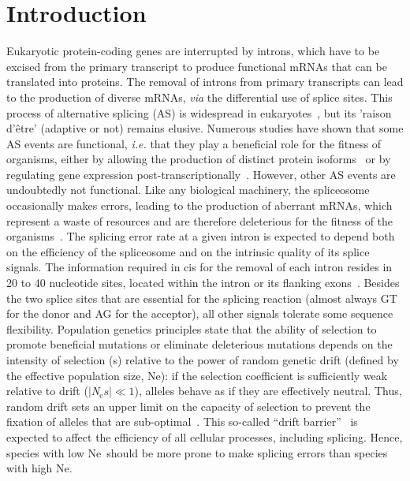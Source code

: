     {\hypersetup{linkcolor=GREYDARK}\minitoc\newpage}
    
\graphicspath{{chap6-Alternative Splicing/figures/}}

\section{Introduction}
Eukaryotic protein-coding genes are interrupted by introns, which have to be excised from the primary transcript to produce functional mRNAs that can be translated into proteins. The removal of introns from primary transcripts can lead to the production of diverse mRNAs, \textit{via} the differential use of splice sites. This process of alternative splicing (AS) is widespread in eukaryotes~\citep{chen_correcting_2014}, but its 'raison d'être' (adaptive or not) remains elusive. Numerous studies have shown that some \acrshort{AS} events are functional, \textit{i.e.} that they play a beneficial role for the fitness of organisms, either by allowing the production of distinct protein isoforms~\citep{graveley_alternative_2001} or by regulating gene expression post-transcriptionally~\citep{mcglincy_alternative_2008, hamid_emerging_2014}. However, other \acrshort{AS} events are undoubtedly not functional. Like any biological machinery, the spliceosome occasionally makes errors, leading to the production of aberrant mRNAs, which represent a waste of resources and are therefore deleterious for the fitness of the organisms~\citep{hsu_spliceosomes_2009, gout_large-scale_2013}. The splicing error rate at a given intron is expected to depend both on the efficiency of the spliceosome and on the intrinsic quality of its splice signals. The information required in cis for the removal of each intron resides in 20 to 40 nucleotide sites, located within the intron or its flanking exons~\citep{lynch_origins_2006}. Besides the two splice sites that are essential for the splicing reaction (almost always GT for the donor and AG for the acceptor), all other signals tolerate some sequence flexibility. Population genetics principles state that the ability of selection to promote beneficial mutations or eliminate deleterious mutations depends on the intensity of selection (s) relative to the power of random genetic drift (defined by the effective population size, \acrshort{Ne}): if the selection coefficient is sufficiently weak relative to drift ($|$\textit{N}$_{\text{e}} s| \ll 1 $), alleles behave as if they are effectively neutral. Thus, random drift sets an upper limit on the capacity of selection to prevent the fixation of alleles that are sub-optimal~\citep{kimura_mutation_1963, ohta_slightly_1973}. This so-called “drift barrier”~\citep{lynch_frailty_2007} is expected to affect the efficiency of all cellular processes, including splicing. Hence, species with low \acrshort{Ne}~should be more prone to make splicing errors than species with high \acrshort{Ne}.

